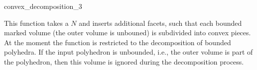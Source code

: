
\ccHtmlNoClassLinks
\begin{ccRefFunction}{convex_decomposition_3}
\label{refconvex_decomposition_3}

\ccDefinition

This function takes a  $N$ and inserts
additional facets, such that each bounded marked volume (the outer
volume is unbouned) is subdivided into convex pieces. At the moment
the function is restricted to the decomposition of bounded
polyhedra. If the input polyhedron is unbounded, i.e., the outer
volume is part of the polyhedron, then this volume is ignored during
the decomposition process.


\ccSeeAlso
{}\\ 

\end{ccRefFunction}
